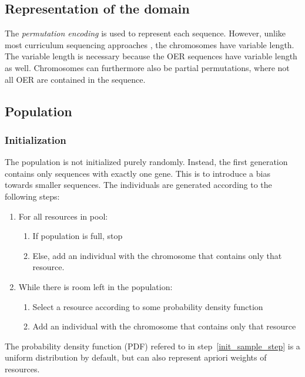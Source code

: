 \subsection{Representation of the domain}
\label{sec:approach_representation}
The \emph{permutation encoding} is used to represent each
sequence. However, unlike most curriculum sequencing approaches
\citep{AlMuhaideb2011}, the chromosomes have variable length. The variable
length is necessary because the OER sequences have variable length as well.
Chromosomes can furthermore also be partial permutations, where not all OER are
contained in the sequence.
\subsection{Population}
\subsubsection{Initialization}
\label{sec:approach_initialization}
The population is not initialized purely randomly. Instead, the first
generation contains only sequences with exactly one gene. This is to introduce
a bias towards smaller sequences. The individuals are generated according to
the following steps:
\begin{enumerate}
	\item For all resources in pool:
		\begin{enumerate}
			\item If population is full, stop
			\item Else, add an individual with the chromosome that contains
				only that resource.
		\end{enumerate}
	\item While there is room left in the population:
		\begin{enumerate}
			\item \label{init_sample_step}Select a resource according to some probability density function
			\item Add an individual with the chromosome that contains only that
				resource
		\end{enumerate}
\end{enumerate}
The probability density function (PDF) refered to in
step~\ref{init_sample_step} is a uniform distribution by default, but can also
represent apriori weights of resources.
